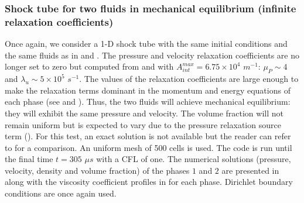 \documentclass[preprint,10pt]{elsarticle}
\begin{document}
\subsubsection{Shock tube for two fluids in mechanical equilibrium (infinite relaxation coefficients)}\label{sec:shock-tube-infinite-rel-coeff}
%
Once again, we consider a 1-D shock tube with the same initial conditions and the same fluids as in  and . 
The pressure and velocity relaxation coefficients are no longer set to zero but computed from  and  with $A_{int}^{max} =  
6.75 \times 10^4$ $m^{-1}$: $\mu_P \sim 4$ and $\lambda_u \sim 5 \times 10^5$ $s^{-1}$. The values of the relaxation coefficients are large enough to make the 
relaxation terms dominant in the momentum and energy equations of each phase (see  and ). Thus, the two fluids will achieve mechanical equilibrium: they will exhibit the 
same pressure and velocity. The volume fraction will not remain uniform but is expected to vary due to the pressure relaxation source term (). For 
this test, an exact solution is not available but the reader can refer to \cite{Saurel_2007} for a comparison.  An uniform mesh of 500 cells is used. The code is 
run until the final time $t = 305$ $\mu s$ with a CFL of one. The numerical solutions (pressure, velocity, density and volume fraction) of the phases $1$ and $2$ are presented in  along with the viscosity coefficient profiles in  for each phase. Dirichlet boundary conditions are once again used.
%
\end{document}
